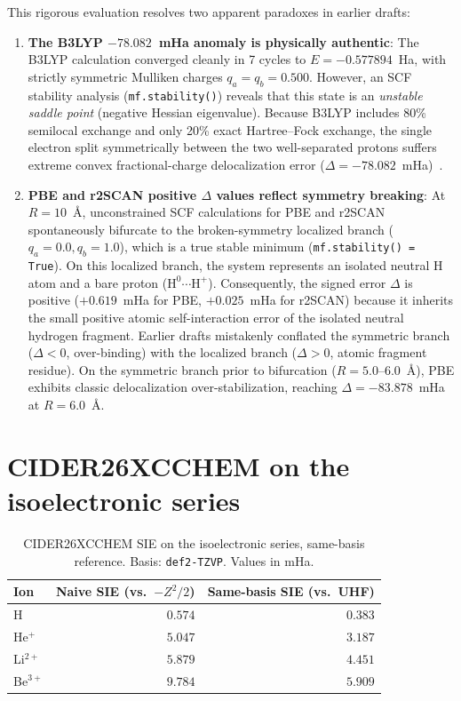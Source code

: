 \documentclass[11pt]{report}
\theoremstyle{definition}
\theoremstyle{remark}
\begin{document}
This rigorous evaluation resolves two apparent paradoxes in earlier drafts:
\begin{enumerate}
  \item \textbf{The B3LYP $-78.082$~mHa anomaly is physically authentic}:
        The B3LYP calculation converged cleanly in 7 cycles to $E = -0.577894$~Ha,
        with strictly symmetric Mulliken charges $q_a = q_b = 0.500$. However,
        an SCF stability analysis (\texttt{mf.stability()}) reveals that this state
        is an \emph{unstable saddle point} (negative Hessian eigenvalue). Because
        B3LYP includes 80\% semilocal exchange and only 20\% exact Hartree--Fock
        exchange, the single electron split symmetrically between the two well-separated
        protons suffers extreme convex fractional-charge delocalization error
        ($\Delta = -78.082$~mHa)~\cite{CMSY2008,CMSY2012,PPLB1982}.
  \item \textbf{PBE and r2SCAN positive $\Delta$ values reflect symmetry breaking}:
        At $R = 10$~\AA, unconstrained SCF calculations for PBE and r2SCAN
        spontaneously bifurcate to the broken-symmetry localized branch
        ($q_a = 0.0, q_b = 1.0$), which is a true stable minimum (\texttt{mf.stability() = True}).
        On this localized branch, the system represents an isolated neutral H atom
        and a bare proton ($\text{H}^0 \cdots \text{H}^+$). Consequently, the signed
        error $\Delta$ is positive ($+0.619$~mHa for PBE, $+0.025$~mHa for r2SCAN)
        because it inherits the small positive atomic self-interaction error of
        the isolated neutral hydrogen fragment. Earlier drafts mistakenly conflated
        the symmetric branch ($\Delta < 0$, over-binding) with the localized branch
        ($\Delta > 0$, atomic fragment residue). On the symmetric branch prior to
        bifurcation ($R = 5.0\text{--}6.0$~\AA), PBE exhibits classic delocalization
        over-stabilization, reaching $\Delta = -83.878$~mHa at $R = 6.0$~\AA.
\end{enumerate}

\section{CIDER26XCCHEM on the isoelectronic series}

\begin{table}[htbp]
\centering
\caption{CIDER26XCCHEM SIE on the isoelectronic series, same-basis
reference. Basis: \texttt{def2-TZVP}. Values in mHa.}
\label{tab:cider-iso}
\begin{tabular}{lrr}
\toprule
Ion & Naive SIE (vs.\ $-Z^2/2$) & Same-basis SIE (vs.\ UHF) \\
\midrule
H        & $0.574$ & $0.383$ \\
He$^+$   & $5.047$ & $3.187$ \\
Li$^{2+}$& $5.879$ & $4.451$ \\
Be$^{3+}$& $9.784$ & $5.909$ \\
\bottomrule
\end{tabular}
\end{table}
\end{document}
